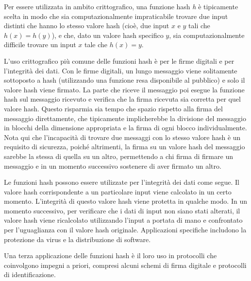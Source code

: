 \documentclass{article}
\theoremstyle{definition}
\begin{document}
Per essere utilizzata in ambito crittografico, una funzione hash \textit{h} è tipicamente scelta in modo che sia computazionalmente impraticabile trovare due input distinti che hanno lo stesso valore hash (cioè, due input \(x\) e \(y\) tali che \(h(x) = h(y)\)), e che, dato un valore hash specifico \(y\), sia computazionalmente difficile trovare un input \(x\) tale che \(h(x) = y\).

L'uso crittografico più comune delle funzioni hash è per le firme digitali e per l'integrità dei dati. Con le firme digitali, un lungo messaggio viene solitamente sottoposto a hash (utilizzando una funzione resa disponibile al pubblico) e solo il valore hash viene firmato. La parte che riceve il messaggio poi esegue la funzione hash sul messaggio ricevuto e verifica che la firma ricevuta sia corretta per quel valore hash. Questo risparmia sia tempo che spazio rispetto alla firma del messaggio direttamente, che tipicamente implicherebbe la divisione del messaggio in blocchi della dimensione appropriata e la firma di ogni blocco individualmente. Nota qui che l'incapacità di trovare due messaggi con lo stesso valore hash è un requisito di sicurezza, poiché altrimenti, la firma su un valore hash del messaggio sarebbe la stessa di quella su un altro, permettendo a chi firma di firmare un messaggio e in un momento successivo sostenere di aver firmato un altro.

Le funzioni hash possono essere utilizzate per l'integrità dei dati come segue. Il valore hash corrispondente a un particolare input viene calcolato in un certo momento. L'integrità di questo valore hash viene protetta in qualche modo. In un momento successivo, per verificare che i dati di input non siano stati alterati, il valore hash viene ricalcolato utilizzando l'input a portata di mano e confrontato per l'uguaglianza con il valore hash originale. Applicazioni specifiche includono la protezione da virus e la distribuzione di software.

Una terza applicazione delle funzioni hash è il loro uso in protocolli che coinvolgono impegni a priori, compresi alcuni schemi di firma digitale e protocolli di identificazione.

    
\end{document}
